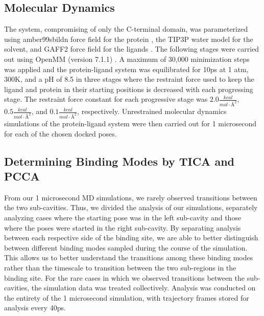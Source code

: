 \subsection{Molecular Dynamics}
The system, compromising of only the C-terminal domain, was parameterized using amber99sbildn force field for the protein \cite{wang2004development}, the TIP3P water model \cite{jorgensen1983comparison} for the solvent, and GAFF2 force field for the ligands \cite{lindorff-larsen_improved_2010}.
The following stages were carried out using OpenMM (version 7.1.1) \cite{eastman_openmm_2017,eastman_openmm_2013}.
A maximum of 30,000 minimization steps was applied and the protein-ligand system was equilibrated for 10ps at 1 atm, 300K, and a pH of 8.5 in three stages where the restraint force used to keep the ligand and protein in their starting positions is decreased with each progressing stage. 
The restraint force constant for each progressive stage was $2.0 \frac{kcal}{mol \cdot \mbox{\AA} ^{2}}$, $0.5 \frac{kcal}{mol \cdot \mbox{\AA} ^{2}}$, and $0.1 \frac{kcal}{mol \cdot \mbox{\AA} ^{2}}$, respectively. 
Unrestrained molecular dynamics simulations of the protein-ligand system were then carried out for 1 microsecond for each of the chosen docked poses.

\subsection{Determining Binding Modes by TICA and PCCA}
From our 1 microsecond MD simulations, we rarely observed transitions between the two sub-cavities.
Thus, we divided the analysis of our simulations, separately analyzing cases where the starting pose was in the left sub-cavity and those where the poses were started in the right sub-cavity.
By separating analysis between each respective side of the binding site, we are able to better distinguish between different binding modes sampled during the course of the simulation. 
This allows us to better understand the transitions among these binding modes rather than the timescale to transition between the two sub-regions in the binding site.
For the rare cases in which we observed transitions between the sub-cavities, the simulation data was treated collectively.
Analysis was conducted on the entirety of the 1 microsecond simulation, with trajectory frames stored for analysis every 40ps.

